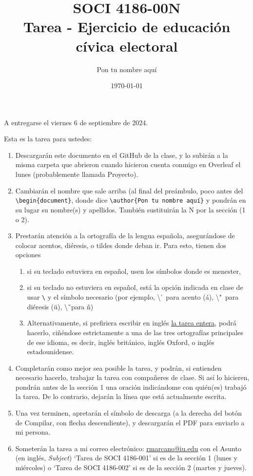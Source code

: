 \documentclass[11pt]{article} %
\title{SOCI 4186-00N\\ Tarea \textnumero 2 - Ejercicio de educaci\'on c\'ivica electoral}
\author{Pon tu nombre aquí}
\date{\today}
\begin{document}
\maketitle
\begin{center}
A entregarse el viernes 6 de septiembre de 2024. 
\end{center}

Esta es la tarea para ustedes: 
\begin{enumerate}
    \item Descargarán este documento en el GitHub de la clase, y lo subirán a la misma carpeta que abrieron cuando hicieron cuenta conmigo en Overleaf el lunes (probablemente llamada Proyecto).
    \item Cambiarán el nombre que sale arriba (al final del preámbulo, poco antes del \texttt{\textbackslash begin\{document\}}, donde dice \texttt{\textbackslash author\{Pon tu nombre aquí\}} y pondrán en su lugar su nombre(s) y apellidos. También sustituirán la N por la sección (1 o 2).
    \item Prestarán atención a la ortografía de la lengua española, asegurándose de colocar acentos, diéresis, o tildes donde deban ir. Para esto, tienen dos opciones 
    \begin{enumerate}
        \item si su teclado estuviera en español, usen los símbolos donde es menester,
        \item si su teclado no estuviera en español, está la opción indicada en clase de usar \texttt{\textbackslash} y el símbolo necesario (por ejemplo, \textbackslash'\ para acento (\'a), \textbackslash "\  para diéresis (\"u), \textbackslash \~\ para \~n)
        \item Alternativamente, si prefiriera escribir en inglés \underline{la tarea entera}, podrá hacerlo, ciñéndose estrictamente a una de las tres ortografías principales de ese idioma, es decir, inglés británico, inglés Oxford, o inglés estadounidense.
    \end{enumerate}
    \item Completarán como mejor sea posible la tarea, y podrán, si entienden necesario hacerlo, trabajar la tarea con compañeres de clase. Si así lo hicieren, pondrán antes de la sección 1 una oración indicándome con quién(es) trabajó la tarea. De lo contrario, dejarán la línea que está actualmente escrita.
    \item  Una vez terminen, apretarán el símbolo de descarga (a la derecha del botón de Compilar, con flecha descendiente), y descargarán el PDF para enviarlo a mi persona.
    \item Someterán la tarea a mi correo electrónico: \href{mailto:rmarcano@iu.edu}{rmarcano@iu.edu} con el Asunto (en inglés, \textit{Subject}) `Tarea de SOCI 4186-001' si es de la sección 1 (lunes y miércoles) o `Tarea de SOCI 4186-002' si es de la sección 2 (martes y jueves).
\end{enumerate}
\end{document}

